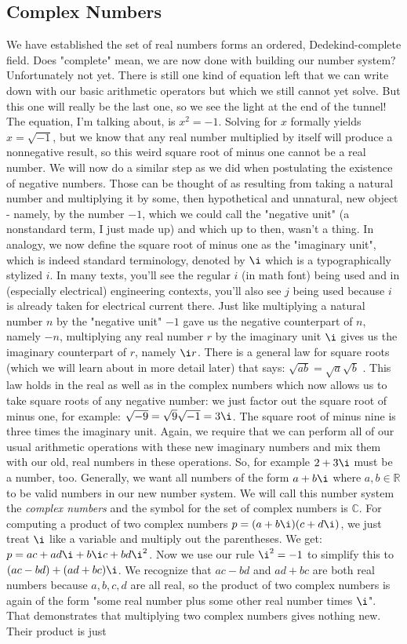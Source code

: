 \subsection{Complex Numbers}
We have established the set of real numbers forms an ordered, Dedekind-complete field. Does "complete" mean, we are now done with building our number system? Unfortunately not yet. There is still one kind of equation left that we can write down with our basic arithmetic operators but which we still cannot yet solve. But this one will really be the last one, so we see the light at the end of the tunnel! The equation, I'm talking about, is $x^2 = -1$. Solving for $x$ formally yields $x = \sqrt{-1}$, but we know that any real number multiplied by itself will produce a nonnegative result, so this weird square root of minus one cannot be a real number. We will now do a similar step as we did when postulating the existence of negative numbers. Those can be thought of as resulting from taking a natural number and multiplying it by some, then hypothetical and unnatural, new object - namely, by the number $-1$, which we could call the "negative unit" (a nonstandard term, I just made up) and which up to then, wasn't a thing. In analogy, we now define the square root of minus one as the "imaginary unit", which is indeed standard terminology, denoted by $\i$ which is a typographically stylized $i$. In many texts, you'll see the regular $i$ (in math font) being used and in (especially electrical) engineering contexts, you'll also see $j$ being used because $i$ is already taken for electrical current there. Just like multiplying a natural number $n$ by the "negative unit" $-1$ gave us the negative counterpart of $n$, namely $-n$, multiplying any real number $r$ by the imaginary unit $\i$ gives us the imaginary counterpart of $r$, namely $\i r$. There is a general law for square roots (which we will learn about in more detail later) that says: $\sqrt{a b} = \sqrt{a} \sqrt{b}$ . This law holds in the real as well as in the complex numbers which now allows us to take square roots of any negative number: we just factor out the square root of minus one, for example: $\sqrt{-9} = \sqrt{9} \sqrt{-1} = 3 \i$. The square root of minus nine is three times the imaginary unit. Again, we require that we can perform all of our usual arithmetic operations with these new imaginary numbers and mix them with our old, real numbers in these operations. So, for example $2 + 3 \i$ must be a number, too. Generally, we want all numbers of the form $a + b \i$ where $a,b \in \mathbb{R}$ to be valid numbers in our new number system. We will call this number system the \emph{complex numbers} and the symbol for the set of complex numbers is $\mathbb{C}$. For computing a product of two complex numbers $p = (a + b \i)(c + d \i)$, we just treat $\i$ like a variable and multiply out the parentheses. We get: $p = a c + a d \i + b \i c + b d \i^2$. Now we use our rule $\i^2 = -1$ to simplify this to $(ac - bd) + (a d + b c) \i$. We recognize that $ac - bd$ and $ad + bc$ are both real numbers because $a,b,c,d$ are all real, so the product of two complex numbers is again of the form "some real number plus some other real number times $\i$". That demonstrates that multiplying two complex numbers gives nothing new. Their product is just 
